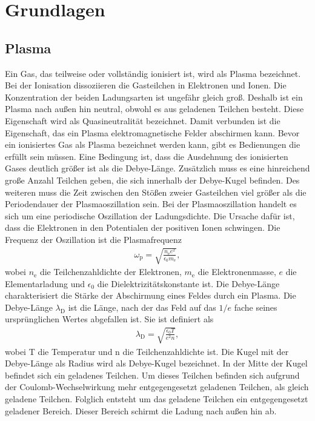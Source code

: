\section{Grundlagen}
\subsection{Plasma}\label{sec:plasma}
Ein Gas, das teilweise oder vollständig ionisiert ist, wird als Plasma \cite{Plasmaphysik} bezeichnet. Bei der Ionisation dissoziieren die Gasteilchen in Elektronen und Ionen. Die Konzentration der beiden Ladungsarten ist ungefähr gleich groß. Deshalb ist ein Plasma nach außen hin neutral, obwohl es aus geladenen Teilchen besteht. Diese Eigenschaft wird als Quasineutralität bezeichnet. Damit verbunden ist die Eigenschaft, das ein Plasma elektromagnetische Felder abschirmen kann. 
Bevor ein ionisiertes Gas als Plasma bezeichnet werden kann, gibt es Bedienungen die erfüllt sein müssen.  Eine Bedingung ist, dass die Ausdehnung des ionisierten Gases deutlich größer ist als die Debye-Länge. Zusätzlich muss es eine hinreichend große Anzahl Teilchen geben, die sich innerhalb der Debye-Kugel befinden. Des weiteren muss die Zeit zwischen den Stößen zweier Gasteilchen viel größer als die Periodendauer der Plasmaoszillation sein. Bei der Plasmaoszillation handelt es sich um eine periodische Oszillation der Ladungsdichte. Die Ursache dafür ist, dass die Elektronen in den Potentialen der positiven Ionen schwingen. Die Frequenz der Oszillation ist die Plasmafrequenz
\begin{align}
\omega_{\mathrm{p}}=\sqrt{\frac{n_{\mathrm{e}}e^2}{\epsilon_0 m_{\mathrm{e}}}},
\end{align}
wobei $n_{\mathrm{e}}$ die Teilchenzahldichte der Elektronen, $m_{\mathrm{e}}$ die Elektronenmasse, $e$ die Elementarladung und $\epsilon_0$ die Dielektrizitätskonstante ist. Die Debye-Länge charakterisiert die Stärke der Abschirmung  eines Feldes durch ein Plasma. Die Debye-Länge $\lambda_{\mathrm{D}}$ ist die Länge, nach der das Feld auf das $1/e$ fache seines ursprünglichen Wertes abgefallen ist. Sie ist definiert als
\begin{align}
\lambda_{\mathrm{D}}=\sqrt{\frac{\epsilon_0 T}{e^2 n}},
\end{align}
wobei T die Temperatur und n die Teilchenzahldichte ist. Die Kugel mit der Debye-Länge als Radius wird als Debye-Kugel bezeichnet. In der Mitte der Kugel befindet sich ein geladenes Teilchen. Um dieses Teilchen befinden sich aufgrund der Coulomb-Wechselwirkung mehr entgegengesetzt geladenen Teilchen, als gleich geladene Teilchen. Folglich entsteht um das geladene Teilchen ein entgegengesetzt geladener Bereich. Dieser Bereich schirmt die Ladung nach außen hin ab.
